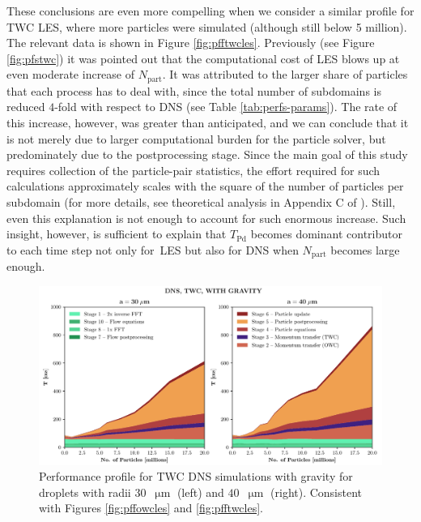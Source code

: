 \documentclass{pracamgren}
\begin{document}
These conclusions are even more compelling when we consider a similar profile for TWC LES, where more particles were simulated (although still below 5 million).
The relevant data is shown in Figure \ref{fig:pfftwcles}.
Previously (see Figure \ref{fig:pfstwc}) it was pointed out that the computational cost of LES blows up at even moderate increase of $N_{\text{part}}$.
It was attributed to the larger share of particles that each process has to deal with, since the total number of subdomains is reduced $4$-fold with respect to DNS (see Table \ref{tab:perfs-params}).
The rate of this increase, however, was greater than anticipated, and we can conclude that it is not merely due to larger computational burden for the particle solver, but predominately due to the postprocessing stage.
Since the main goal of this study requires collection of the particle-pair statistics, the effort required for such calculations approximately scales with the square of the number of particles per subdomain (for more details, see theoretical analysis in Appendix C of \textcite{Ayala2014}).
Still, even this explanation is not enough to account for such enormous increase.
Such insight, however, is sufficient to explain that $T_{\text{Pd}}$ becomes dominant contributor to each time step not only for~LES but also for DNS when $N_{\text{part}}$ becomes large enough.

\begin{figure}[h]
\centering
\includegraphics[width=13.5cm]{img/plots/3-3d-pfftwcdns.pdf}
\caption{
Performance profile for TWC DNS simulations with gravity for droplets with radii $30$~$\upmu\text{m}$ (left) and $40$~$\upmu\text{m}$ (right).
Consistent with Figures \ref{fig:pffowcles} and \ref{fig:pfftwcles}.
}
\label{fig:pfftwcdns}
\end{figure}
\end{document}
